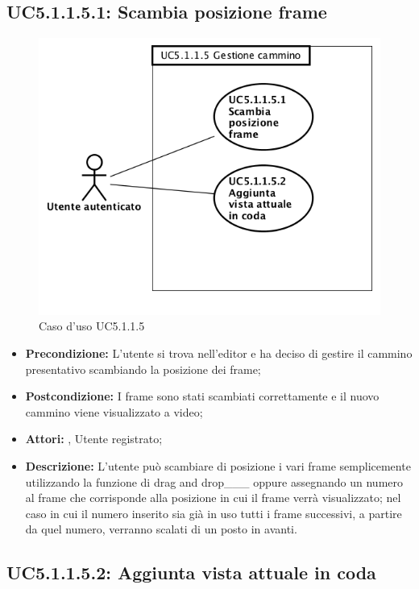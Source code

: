 \subsection{ UC5.1.1.5.1: Scambia posizione frame}

\begin{figure}[h]
	\begin{center}
	\includegraphics[scale=0.4]{diagram/UC5-1-1-5.png}
	\caption{Caso d'uso UC5.1.1.5}
	\end{center}
\end{figure}
\begin{itemize}
	\item \textbf{Precondizione:} L’utente si trova nell’editor e ha deciso di gestire il cammino presentativo scambiando la posizione dei frame;
	\item \textbf{Postcondizione:} I frame sono stati scambiati correttamente e il nuovo cammino viene visualizzato a video;
	\item \textbf{Attori:} , Utente registrato;
	\item \textbf{Descrizione:} L’utente può scambiare di posizione i vari frame semplicemente utilizzando la funzione di drag and drop___ oppure assegnando un numero al frame che corrisponde alla posizione in cui il frame verrà visualizzato; nel caso in cui il numero inserito sia già in uso tutti i frame successivi, a partire da quel numero, verranno scalati di un posto in avanti.
\end{itemize}
\subsection{ UC5.1.1.5.2: Aggiunta vista attuale in coda}

